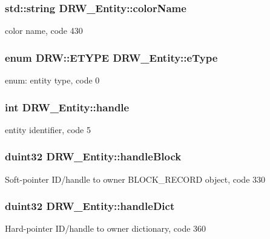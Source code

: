 \subsubsection[{color\+Name}]{\setlength{\rightskip}{0pt plus 5cm}std\+::string D\+R\+W\+\_\+\+Entity\+::color\+Name}\label{class_d_r_w___entity_a84620ae9c9eea40d9d6373f28db5877a}
color name, code 430 \hypertarget{class_d_r_w___entity_a36dff42707384984a085dbea602d0217}{}
\subsubsection[{e\+Type}]{\setlength{\rightskip}{0pt plus 5cm}enum D\+R\+W\+::\+E\+T\+Y\+P\+E D\+R\+W\+\_\+\+Entity\+::e\+Type}\label{class_d_r_w___entity_a36dff42707384984a085dbea602d0217}
enum\+: entity type, code 0 \hypertarget{class_d_r_w___entity_a32f66a2b4da26f1f9a42ffa8539c916c}{}
\subsubsection[{handle}]{\setlength{\rightskip}{0pt plus 5cm}int D\+R\+W\+\_\+\+Entity\+::handle}\label{class_d_r_w___entity_a32f66a2b4da26f1f9a42ffa8539c916c}
entity identifier, code 5 \hypertarget{class_d_r_w___entity_afb7d80168b82c574d5387c4b0aa4cdd5}{}
\subsubsection[{handle\+Block}]{\setlength{\rightskip}{0pt plus 5cm}duint32 D\+R\+W\+\_\+\+Entity\+::handle\+Block}\label{class_d_r_w___entity_afb7d80168b82c574d5387c4b0aa4cdd5}
Soft-\/pointer I\+D/handle to owner B\+L\+O\+C\+K\+\_\+\+R\+E\+C\+O\+R\+D object, code 330 \hypertarget{class_d_r_w___entity_a76823e459149440d84397803e205dd55}{}
\subsubsection[{handle\+Dict}]{\setlength{\rightskip}{0pt plus 5cm}duint32 D\+R\+W\+\_\+\+Entity\+::handle\+Dict}\label{class_d_r_w___entity_a76823e459149440d84397803e205dd55}
Hard-\/pointer I\+D/handle to owner dictionary, code 360 \hypertarget{class_d_r_w___entity_a62545716d4aec61cabb85576afc78dee}{}
